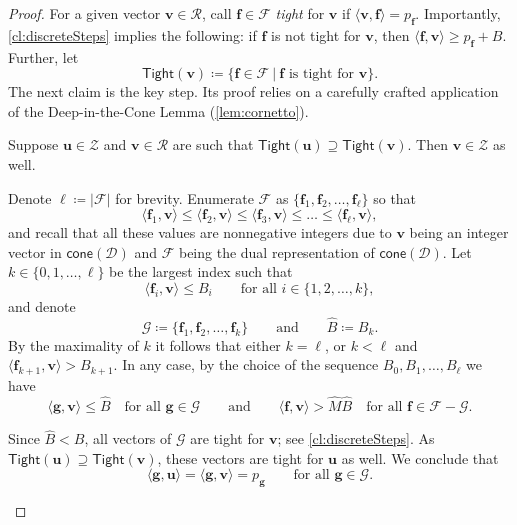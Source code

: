 \documentclass{article}
\renewcommand{\leq}{\leqslant}
\renewcommand{\geq}{\geqslant}
\newcommand{\Dd}{\mathcal{D}}
\newcommand{\tup}[1]{{\mathbf{#1}}}
\newcommand{\ff}{\tup f}
\renewcommand{\gg}{\tup g}
\newcommand{\uu}{\tup u}
\newcommand{\myvv}{\tup v} %
\newcommand{\Ff}{\mathcal{F}}
\newcommand{\Gg}{\mathcal{G}}
\newcommand{\Rr}{\mathcal{R}}
\newcommand{\Zz}{\mathcal{Z}}
\newcommand{\Tight}{\mathsf{Tight}}
\newcommand{\sca}[2]{\langle #1,#2\rangle}
\renewcommand{\setminus}{-}
\newcommand{\realcone}{\mathsf{cone}}
\begin{document}
\begin{proof}
For a given vector $\myvv\in \Rr$, call
$\ff\in \Ff$ {\em{tight}} for $\myvv$ if $\sca{\myvv}{\ff}=p_\ff$. Importantly, \cref{cl:discreteSteps} implies the following: if $\ff$ is not tight for $\myvv$, then $\sca{\ff}{\myvv}\geq p_\ff+B$. Further, let
$$\Tight(\myvv)\coloneqq \{\ff\in \Ff~|~\ff\textrm{ is tight for }\myvv\}.$$
The next claim is the key step. Its proof relies on a carefully crafted application of the Deep-in-the-Cone Lemma (\cref{lem:cornetto}).

\begin{techclaim}\label{cl:tightImplies}
 Suppose $\uu\in \Zz$ and $\myvv\in \Rr$ are such that $\Tight(\uu)\supseteq \Tight(\myvv)$. Then $\myvv\in \Zz$ as well.
\end{techclaim}
\begin{subproof}
 Denote $\ell\coloneqq |\Ff|$ for brevity.
 Enumerate $\Ff$ as $\{\ff_1,\ff_2,\ldots,\ff_{\ell}\}$ so that
 $$\sca{\ff_1}{\myvv} \leq \sca{\ff_2}{\myvv}\leq \sca{\ff_3}{\myvv}\leq \ldots \leq \sca{\ff_{\ell}}{\myvv},$$
 and recall that all these values are nonnegative integers due to $\myvv$ being an integer vector in $\realcone(\Dd)$ and $\Ff$ being the dual representation of $\realcone(\Dd)$. Let $k\in \{0,1,\ldots,\ell\}$ be the largest index such that
 $$\sca{\ff_i}{\myvv}\leq B_i\qquad\textrm{for all }i\in \{1,2,\ldots,k\},$$
 and denote
 $$\Gg\coloneqq \{\ff_1,\ff_2,\ldots,\ff_k\}\qquad\textrm{and}\qquad \widehat{B}\coloneqq B_k.$$
 By the maximality of $k$ it follows that either $k=\ell$, or $k<\ell$ and $\sca{\ff_{k+1}}{\myvv}>B_{k+1}$. In any case, by the choice of the sequence $B_0,B_1,\ldots,B_\ell$ we have
 \begin{equation}\label{eq:wydra}
 \sca{\gg}{\myvv} \leq \widehat{B}\quad\textrm{for all }\gg\in \Gg\qquad\textrm{and}\qquad \sca{\ff}{\myvv}>\widehat{M}\widehat{B}\quad \textrm{for all }\ff\in \Ff\setminus \Gg.\end{equation}

 Since $\widehat{B}<B$, all vectors of $\Gg$ are tight for $\myvv$; see \cref{cl:discreteSteps}. As $\Tight(\uu)\supseteq \Tight(\myvv)$, these vectors are tight for $\uu$ as well. We conclude that
 \begin{equation}\label{eq:kapibara}
 \sca{\gg}{\uu}=\sca{\gg}{\myvv}=p_{\gg}\qquad \textrm{for all }\gg\in \Gg.
 \end{equation}


\end{subproof}
\end{proof}
\end{document}
